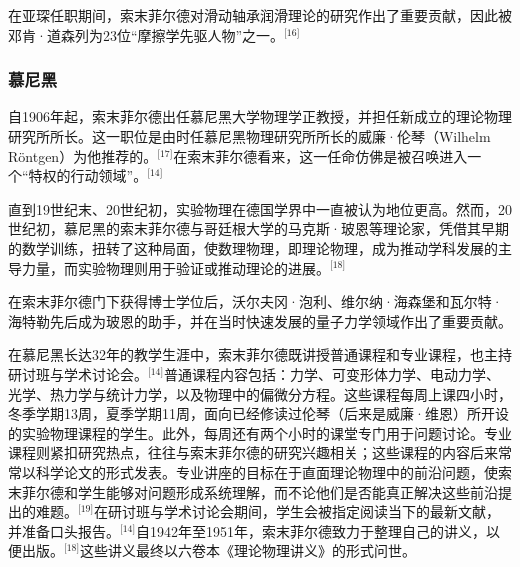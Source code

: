 在亚琛任职期间，索末菲尔德对滑动轴承润滑理论的研究作出了重要贡献，因此被邓肯·道森列为23位“摩擦学先驱人物”之一。\(^\text{[16]}\)
\subsubsection{慕尼黑}
自1906年起，索末菲尔德出任慕尼黑大学物理学正教授，并担任新成立的理论物理研究所所长。这一职位是由时任慕尼黑物理研究所所长的威廉·伦琴（Wilhelm Röntgen）为他推荐的。\(^\text{[17]}\)在索末菲尔德看来，这一任命仿佛是被召唤进入一个“特权的行动领域”。\(^\text{[14]}\)

直到19世纪末、20世纪初，实验物理在德国学界中一直被认为地位更高。然而，20世纪初，慕尼黑的索末菲尔德与哥廷根大学的马克斯·玻恩等理论家，凭借其早期的数学训练，扭转了这种局面，使数理物理，即理论物理，成为推动学科发展的主导力量，而实验物理则用于验证或推动理论的进展。\(^\text{[18]}\)

在索末菲尔德门下获得博士学位后，沃尔夫冈·泡利、维尔纳·海森堡和瓦尔特·海特勒先后成为玻恩的助手，并在当时快速发展的量子力学领域作出了重要贡献。

在慕尼黑长达32年的教学生涯中，索末菲尔德既讲授普通课程和专业课程，也主持研讨班与学术讨论会。\(^\text{[14]}\)普通课程内容包括：力学、可变形体力学、电动力学、光学、热力学与统计力学，以及物理中的偏微分方程。这些课程每周上课四小时，冬季学期13周，夏季学期11周，面向已经修读过伦琴（后来是威廉·维恩）所开设的实验物理课程的学生。此外，每周还有两个小时的课堂专门用于问题讨论。专业课程则紧扣研究热点，往往与索末菲尔德的研究兴趣相关；这些课程的内容后来常常以科学论文的形式发表。专业讲座的目标在于直面理论物理中的前沿问题，使索末菲尔德和学生能够对问题形成系统理解，而不论他们是否能真正解决这些前沿提出的难题。\(^\text{[19]}\)在研讨班与学术讨论会期间，学生会被指定阅读当下的最新文献，并准备口头报告。\(^\text{[14]}\)自1942年至1951年，索末菲尔德致力于整理自己的讲义，以便出版。\(^\text{[18]}\)这些讲义最终以六卷本《理论物理讲义》的形式问世。

